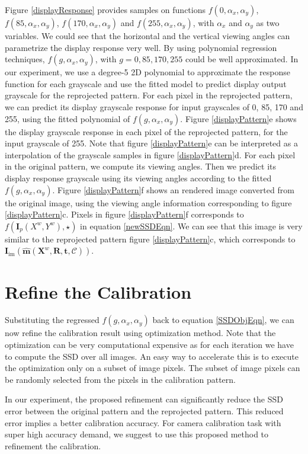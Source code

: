 \documentclass{report}
\begin{document}
Figure \ref{displayResponse} provides samples on functions $f(0, \alpha_x, \alpha_y)$, $f(85, \alpha_x, \alpha_y)$, $f(170, \alpha_x, \alpha_y)$ and $f(255, \alpha_x, \alpha_y)$, with $\alpha_x$ and $\alpha_y$ as two variables. We could see that the horizontal and the vertical viewing angles can parametrize the display response very well. By using polynomial regression techniques, $f(g, \alpha_x, \alpha_y)$, with $g = 0, 85, 170, 255$ could be well approximated. In our experiment, we use a degree-5 2D polynomial to approximate the response function for each grayscale and use the fitted model to predict display output grayscale for the reprojected pattern. For each pixel in the reprojected pattern, we can predict its display grayscale response for input grayscales  of 0, 85, 170 and 255, using the fitted polynomial of $f(g, \alpha_x, \alpha_y)$. Figure \ref{displayPattern}e shows the display grayscale response in each pixel of the reprojected pattern, for the input grayscale of 255. Note that figure \ref{displayPattern}e can be interpreted as a interpolation of the grayscale samples in figure \ref{displayPattern}d. For each pixel in the original pattern, we compute its viewing angles. Then we predict its display response grayscale using its viewing angles according to the fitted $f(g, \alpha_x, \alpha_y)$. Figure \ref{displayPattern}f shows an rendered image converted from the original image, using the viewing angle information corresponding to figure \ref{displayPattern}c. Pixels in figure \ref{displayPattern}f corresponds to $f\left( \mathbf{I}_p(X^w, Y^w), \star \right)$ in equation \ref{newSSDEqn}. We can see that this image is very similar to the reprojected pattern figure \ref{displayPattern}c, which corresponds to $\mathbf{I}_\text{im}\left(\hat{\mathbf{m}}(\mathbf{X}^w, \mathbf{R}, \mathbf{t}, \mathcal{C})\right)$. 


\section{Refine the Calibration}
Substituting the regressed $f(g, \alpha_x, \alpha_y)$ back to equation \ref{SSDObjEqn}, we can now refine the calibration result using optimization method. Note that the optimization can be very computational expensive as for each iteration we have to compute the SSD over all images. An easy way to accelerate this is to execute the optimization only on a subset of image pixels. The subset of image pixels can be randomly selected from the pixels in the calibration pattern.
 
\bigskip
In our experiment, the proposed refinement can significantly reduce the SSD error between the original pattern and the reprojected pattern. This reduced error implies a better calibration accuracy. For camera calibration task with super high accuracy demand, we suggest to use this proposed method to refinement the calibration. 


\end{document}
